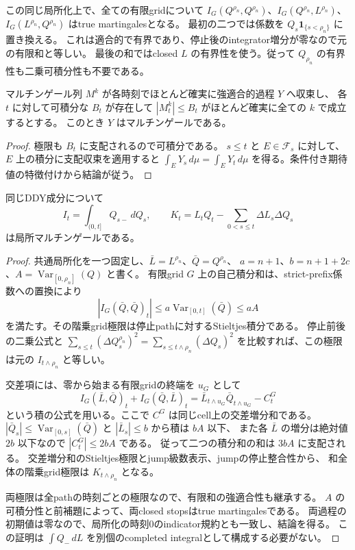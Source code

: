 この同じ局所化上で、全ての有限gridについて
$I_G(Q^{\rho_n},Q^{\rho_n})$、$I_G(Q^{\rho_n},L^{\rho_n})$、
$I_G(L^{\rho_n},Q^{\rho_n})$ はtrue martingalesとなる。
最初の二つでは係数を $Q_s\mathbf1_{\{s<\rho_n\}}$ に置き換える。
これは適合的で有界であり、停止後のintegrator増分が零なので元の有限和と等しい。
最後の和ではclosed $L$ の有界性を使う。従って $Q_{\rho_n}$ の有界性も二乗可積分性も不要である。

\begin{lemma}[可積分支配下のマルチンゲール極限]
マルチンゲール列 $M^k$ が各時刻でほとんど確実に強適合的過程 $Y$ へ収束し、
各 $t$ に対して可積分な $B_t$ が存在して $|M^k_t|\le B_t$ がほとんど確実に全ての $k$ で成立するとする。
このとき $Y$ はマルチンゲールである。
\end{lemma}
\begin{proof}
極限も $B_t$ に支配されるので可積分である。
$s\le t$ と $E\in\mathcal F_s$ に対して、$E$ 上の積分に支配収束を適用すると
$\int_E Y_s\,d\mu=\int_E Y_t\,d\mu$ を得る。条件付き期待値の特徴付けから結論が従う。
\end{proof}

\begin{lemma}[自己積分と交差項の局所マルチンゲール性]
同じDDY成分について
\[
 I_t=\int_{(0,t]}Q_{s-}\,dQ_s,\qquad
 K_t=L_tQ_t-\sum_{0<s\le t}\Delta L_s\Delta Q_s
\]
は局所マルチンゲールである。
\end{lemma}
\begin{proof}
共通局所化を一つ固定し、$\bar L=L^{\rho_n}$、$\bar Q=Q^{\rho_n}$、
$a=n+1$、$b=n+1+2c$、$A=\operatorname{Var}_{[0,\rho_n]}(Q)$ と書く。
有限grid $G$ 上の自己積分和は、strict-prefix係数への置換により
\[
 |I_G(\bar Q,\bar Q)_t|
 \le a\operatorname{Var}_{[0,t]}(\bar Q)\le aA
\]
を満たす。その階乗grid極限は停止pathに対するStieltjes積分である。
停止前後の二乗公式と
$\sum_{s\le t}(\Delta Q^{\rho_n}_s)^2=\sum_{s\le t\wedge\rho_n}(\Delta Q_s)^2$
を比較すれば、この極限は元の $I_{t\wedge\rho_n}$ と等しい。

交差項には、零から始まる有限gridの終端を $u_G$ として
\[
 I_G(\bar L,\bar Q)_t+I_G(\bar Q,\bar L)_t
 =\bar L_{t\wedge u_G}\bar Q_{t\wedge u_G}-C^G_t
\]
という積の公式を用いる。ここで $C^G$ は同じcell上の交差増分和である。
$|\bar Q_s|\le\operatorname{Var}_{[0,s]}(\bar Q)$ と $|\bar L_s|\le b$ から積は $bA$ 以下、
また各 $\bar L$ の増分は絶対値 $2b$ 以下なので $|C^G_t|\le2bA$ である。
従って二つの積分和の和は $3bA$ に支配される。
交差増分和のStieltjes極限とjump級数表示、jumpの停止整合性から、
和全体の階乗grid極限は $K_{t\wedge\rho_n}$ となる。

両極限は全pathの時刻ごとの極限なので、有限和の強適合性も継承する。
$A$ の可積分性と前補題によって、両closed stopsはtrue martingalesである。
両過程の初期値は零なので、局所化の時刻0のindicator規約とも一致し、結論を得る。
この証明は $\int Q_-\,dL$ を別個のcompleted integralとして構成する必要がない。
\end{proof}

